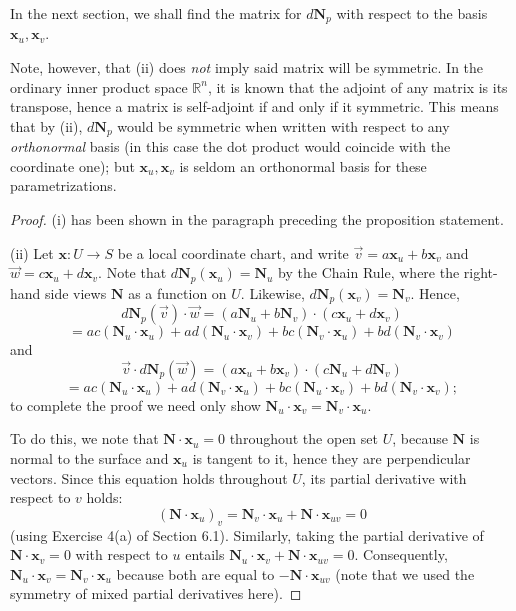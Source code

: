 \documentclass[leqno]{book}
\begin{document}
In the next section, we shall find the matrix for $d\mathbf N_p$ with respect to the basis $\mathbf x_u,\mathbf x_v$.

Note, however, that (ii) does \emph{not} imply said matrix will be symmetric.  In the ordinary inner product space $\mathbb R^n$, it is known that the adjoint of any matrix is its transpose, hence a matrix is self-adjoint if and only if it symmetric.  This means that by (ii), $d\mathbf N_p$ would be symmetric when written with respect to any \emph{orthonormal} basis (in this case the dot product would coincide with the coordinate one); but $\mathbf x_u,\mathbf x_v$ is seldom an orthonormal basis for these parametrizations.
\begin{proof}
(i) has been shown in the paragraph preceding the proposition statement.

(ii) Let $\mathbf x:U\to S$ be a local coordinate chart, and write $\vec v=a\mathbf x_u+b\mathbf x_v$ and $\vec w=c\mathbf x_u+d\mathbf x_v$.  Note that $d\mathbf N_p(\mathbf x_u)=\mathbf N_u$ by the Chain Rule, where the right-hand side views $\mathbf N$ as a function on $U$.  Likewise, $d\mathbf N_p(\mathbf x_v)=\mathbf N_v$.  Hence,
$$d\mathbf N_p(\vec v)\cdot\vec w=(a\mathbf N_u+b\mathbf N_v)\cdot(c\mathbf x_u+d\mathbf x_v)$$
$$=ac(\mathbf N_u\cdot\mathbf x_u)+ad(\mathbf N_u\cdot\mathbf x_v)+bc(\mathbf N_v\cdot\mathbf x_u)+bd(\mathbf N_v\cdot\mathbf x_v)$$
and
$$\vec v\cdot d\mathbf N_p(\vec w)=(a\mathbf x_u+b\mathbf x_v)\cdot(c\mathbf N_u+d\mathbf N_v)$$
$$=ac(\mathbf N_u\cdot\mathbf x_u)+ad(\mathbf N_v\cdot\mathbf x_u)+bc(\mathbf N_u\cdot\mathbf x_v)+bd(\mathbf N_v\cdot\mathbf x_v);$$
to complete the proof we need only show $\mathbf N_u\cdot\mathbf x_v=\mathbf N_v\cdot\mathbf x_u$.

To do this, we note that $\mathbf N\cdot\mathbf x_u=0$ throughout the open set $U$, because $\mathbf N$ is normal to the surface and $\mathbf x_u$ is tangent to it, hence they are perpendicular vectors.  Since this equation holds throughout $U$, its partial derivative with respect to $v$ holds:
$$(\mathbf N\cdot\mathbf x_u)_v=\mathbf N_v\cdot\mathbf x_u+\mathbf N\cdot\mathbf x_{uv}=0$$
(using Exercise 4(a) of Section 6.1).  Similarly, taking the partial derivative of $\mathbf N\cdot\mathbf x_v=0$ with respect to $u$ entails $\mathbf N_u\cdot\mathbf x_v+\mathbf N\cdot\mathbf x_{uv}=0$.  Consequently, $\mathbf N_u\cdot\mathbf x_v=\mathbf N_v\cdot\mathbf x_u$ because both are equal to $-\mathbf N\cdot\mathbf x_{uv}$ (note that we used the symmetry of mixed partial derivatives here).
\end{proof}
\end{document}

